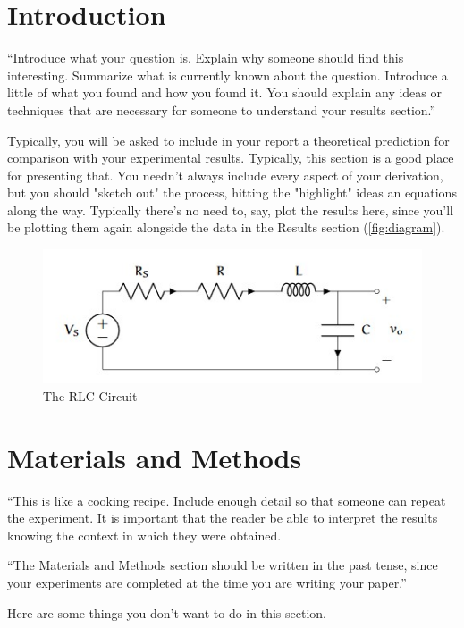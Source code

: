 \documentclass[10pt,twocolumn]{article}
\begin{document}
\section{Introduction} 
\label{sec:introduction}

``Introduce what your question is. Explain why someone should find this interesting. Summarize what is currently known about the question. Introduce a little of what you found and how you found it. You should explain any ideas or techniques that are necessary for someone to understand your results section.''

Typically, you will be asked to include in your report a theoretical prediction for comparison with your experimental results. Typically, this section is a good place for presenting that. You needn't always include every aspect of your derivation, but you should "sketch out" the process, hitting the "highlight" ideas an equations along the way. Typically there's no need to, say, plot the results here, since you'll be plotting them again alongside the data in the Results section (\autoref{fig:diagram}). 

\begin{figure}[bt]
	\centering
	\includegraphics[width=.9\linewidth]{figures/RLCDiagram.JPG}
	\caption{The RLC Circuit}
	\label{fig:diagram}
\end{figure}

\section{Materials and Methods}

``This is like a cooking recipe. Include enough detail so that someone can repeat the experiment. It is important that the reader be able to interpret the results knowing the context in which they were obtained.

``The Materials and Methods section should be written in the past tense, since your experiments are completed at the time you are writing your paper.''

Here are some things you don't want to do in this section.
\end{document}
